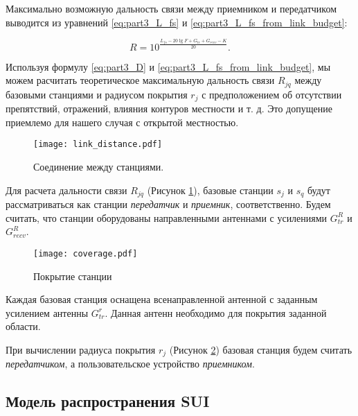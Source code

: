 Максимально возможную дальность связи между приемником и передатчиком выводится из уравнений \cref{eq:part3_L_fs} и \cref{eq:part3_L_fs_from_link_budget}:

\begin{equation}
  \label{eq:part3_D}
  R = 10^\frac{L_{fs} - 20\lg{F} + G_{tr} + G_{recv} - K}{20}.
\end{equation}

Используя формулу \cref{eq:part3_D} и \cref{eq:part3_L_fs_from_link_budget}, мы можем расчитать теоретическое максимальную дальность связи $ R_{jq}$ между базовыми станциями и радиусом покрытия $ r_j $ с предположением об отсутствии препятствий, отражений, влияния контуров местности и т. д. Это допущение приемлемо для нашего случая с открытой местностью.

\begin{figure}[h!]
  \centering
   \texttt{[image: link\_distance.pdf]}
\caption{Соединение между станциями.}
\label{fig:part3_link_distance}
\end{figure}

Для расчета дальности связи $R_{jq}$ (Рисунок \cref{fig:part3_link_distance}), базовые станции $s_j$ и $s_q$ будут рассматриваться как станции \textit{передатчик} и \textit{приемник}, соответственно. Будем считать, что станции оборудованы направленными антеннами с усилениями $G_{tr}^{R}$ и $G_{recv}^{R}$.

\begin{figure}[h!]
  \centering
   \texttt{[image: coverage.pdf]}
\caption{Покрытие станции}
\label{fig:part3_coverage}
\end{figure}

Каждая базовая станция оснащена всенаправленной антенной с заданным усилением антенны $G_ {tr}^{r}$. Данная антенн необходимо для покрытия заданной области.


При вычислении радиуса покрытия $r_j$ (Рисунок  \cref{fig:part3_coverage}) базовая станция будем считать \textit{передатчиком}, а пользовательское устройство \textit{приемником}.

\subsection{Модель распространения SUI}

